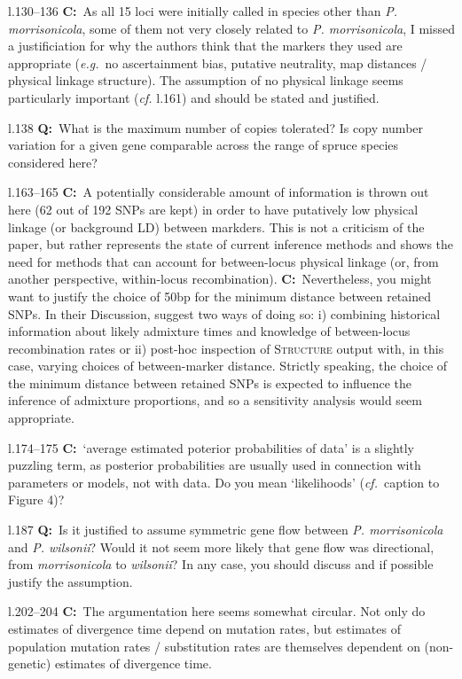 \documentclass[11pt]{article}
\newenvironment{my_description}
{\begin{description}
  \setlength{\itemsep}{2pt}
  \setlength{\parskip}{0pt}
  \setlength{\parsep}{0pt}}
{\end{description}}
\newcommand{\C}{\textbf{C:}\ }
\newcommand{\Q}{\textbf{Q:}\ }
\begin{document}
\begin{my_description}
	\item[l.130--136] \C As all 15 loci were initially called in species other than \emph{P. morrisonicola}, some of them not very closely related to \emph{P. morrisonicola}, I missed a justificiation for why the authors think that the markers they used are appropriate (\emph{e.g.}\ no ascertainment bias, putative neutrality, map distances / physical linkage structure). The assumption of no physical linkage seems particularly important (\emph{cf.} l.161) and should be stated and justified.
	\item[l.138] \Q What is the maximum number of copies tolerated? Is copy number variation for a given gene comparable across the range of spruce species considered here?
	\item[l.163--165] \C A potentially considerable amount of information is thrown out here (62 out of 192 SNPs are kept) in order to have putatively low physical linkage (or background LD) between markders. This is not a criticism of the paper, but rather represents the state of current inference methods and shows the need for methods that can account for between-locus physical linkage (or, from another perspective, within-locus recombination). \C Nevertheless, you might want to justify the choice of 50bp for the minimum distance between retained SNPs. In their Discussion, \citet[][]{Falush:2003fk}  suggest two ways of doing so: i) combining historical information about likely admixture times and knowledge of between-locus recombination rates or ii) post-hoc inspection of \textsc{Structure} output with, in this case, varying choices of between-marker distance. Strictly speaking, the choice of the minimum distance between retained SNPs is expected to influence the inference of admixture proportions, and so a sensitivity analysis would seem appropriate.
	\item[l.174--175] \C `average estimated poterior probabilities of data' is a slightly puzzling term, as posterior probabilities are usually used in connection with parameters or models, not with data. Do you mean `likelihoods' (\emph{cf.}\ caption to Figure 4)?
	\item[l.187] \Q Is it justified to assume symmetric gene flow between \emph{P. morrisonicola} and \emph{P. wilsonii}? Would it not seem more likely that gene flow was directional, from \emph{morrisonicola} to \emph{wilsonii}? In any case, you should discuss and if possible justify the assumption.
	\item[l.202--204] \C The argumentation here seems somewhat circular. Not only do estimates of divergence time depend on mutation rates, but estimates of population mutation rates / substitution rates are themselves dependent on (non-genetic) estimates of divergence time.

\end{my_description}
\end{document}
